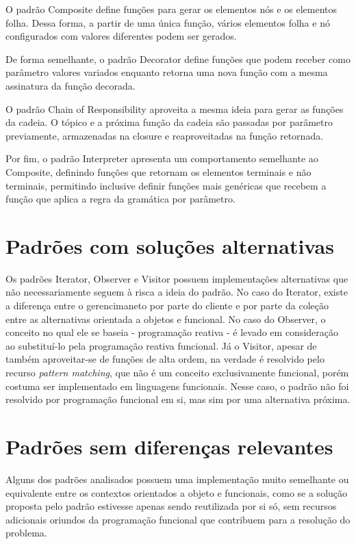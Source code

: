 O padrão Composite define funções para gerar os 
elementos nós e os elementos folha. Dessa forma, 
a partir de uma única função, vários elementos 
folha e nó configurados com valores diferentes 
podem ser gerados.

De forma semelhante, o padrão Decorator define 
funções que podem receber como parâmetro valores 
variados enquanto retorna uma nova função com 
a mesma assinatura da função decorada. 

O padrão Chain of Responsibility aproveita a mesma 
ideia para gerar as funções da cadeia. O tópico e 
a próxima função da cadeia são passadas por parâmetro 
previamente, armazenadas na closure e reaproveitadas 
na função retornada. 

Por fim, o padrão Interpreter apresenta um comportamento 
semelhante ao Composite, definindo funções que retornam 
os elementos terminais e não terminais, permitindo 
inclusive definir funções mais genéricas que recebem 
a função que aplica a regra da gramática por parâmetro.

\section{Padrões com soluções alternativas}

Os padrões Iterator, Observer e Visitor possuem 
implementações alternativas que não necessariamente 
seguem à risca a ideia do padrão. No caso do Iterator, 
existe a diferença entre o gerencimaneto por parte 
do cliente e por parte da coleção entre as 
alternativas orientada a objetos e funcional. No 
caso do Observer, o conceito no qual ele se 
baseia - programação reativa - é levado em 
consideração ao substituí-lo pela programação 
reativa funcional. Já o Visitor, apesar de também 
aproveitar-se de funções de alta ordem, na verdade 
é resolvido pelo recurso \textit{pattern matching}, 
que não é um conceito exclusivamente funcional, 
porém costuma ser implementado em linguagens 
funcionais. Nesse caso, o padrão não foi 
resolvido por programação funcional em si, 
mas sim por uma alternativa próxima. 

\section{Padrões sem diferenças relevantes}

Alguns dos padrões analisados possuem 
uma implementação muito semelhante ou 
equivalente entre os contextos orientados 
a objeto e funcionais, como se a solução 
proposta pelo padrão estivesse apenas 
sendo reutilizada por si só, sem 
recursos adicionais oriundos da programação 
funcional que contribuem para a 
resolução do problema. 

